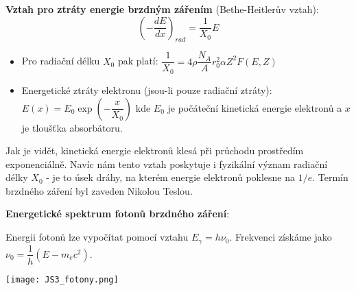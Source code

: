\documentclass[../../main.tex]{subfiles}
\begin{document}
\textbf{Vztah pro ztráty energie brzdným zářením} (Bethe-Heitlerův vztah): 
\begin{equation}
\left(- \dfrac{dE}{dx} \right) _{rad} = \dfrac{1}{X_0} E
\end{equation}

\begin{itemize}
	\item Pro radiační délku $X_0$ pak platí: $\dfrac{1}{X_0} = 4 \rho \dfrac{N_A}{A} r_{0}^2 \alpha Z^2 F(E,Z)$
	\item Energetické ztráty elektronu (jsou-li pouze radiační ztráty): $E(x) = E_0 \exp \left(-\dfrac{x}{X_0} \right)$
	kde $E_0$ je počáteční kinetická energie elektronů a $x$ je tloušťka absorbátoru.
\end{itemize}

Jak je vidět, kinetická energie elektronů klesá při průchodu prostředím exponenciálně. Navíc nám tento vztah poskytuje i fyzikální význam radiační délky $X_0$ - je to úsek dráhy, na kterém energie elektronů poklesne na $1/e$. Termín brzdného záření byl zaveden Nikolou Teslou.

\textbf{Energetické spektrum fotonů brzdného záření}:

Energii fotonů lze vypočítat pomocí vztahu $E_{\gamma} = h \nu_0$. Frekvenci získáme jako $\nu_0 = \dfrac{1}{h} (E - m_e c^2)$. 

\begin{center}
	\texttt{[image: JS3\_fotony.png]}
\end{center}
 	
\end{document}
